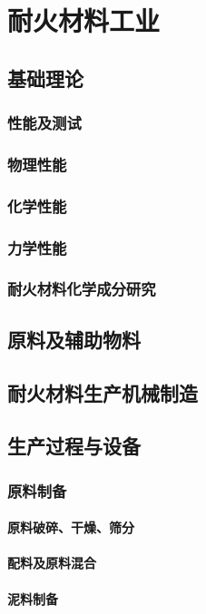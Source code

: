 \documentclass[UTF8]{../../ApplicationUniverse}
\begin{document}
\chapter{耐火材料工业}
\section{基础理论}
    \subsection{性能及测试}
    \subsection{物理性能}
    \subsection{化学性能}
    \subsection{力学性能}
    \subsection{耐火材料化学成分研究}
\section{原料及辅助物料}
\section{耐火材料生产机械制造}
\section{生产过程与设备}
    \subsection{原料制备}
        \subsubsection{原料破碎、干燥、筛分}
        \subsubsection{配料及原料混合}
        \subsubsection{泥料制备}
\end{document}
